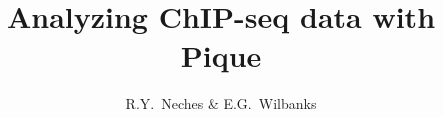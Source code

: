 \documentclass{article}
\author{R.Y.~Neches \& E.G.~Wilbanks}
\title{Analyzing ChIP-seq data with Pique}
\begin{document}
\maketitle

\newcommand{\imsize}{0.45\columnwidth}
\newcommand{\threeup}{0.26\columnwidth}
\newcommand{\cotwo}{$\text{CO}_{2}$}
\newcommand{\htwo}{$\text{H}_2$}
\newcommand{\otwo}{$\text{O}_2$}
\newcommand{\water}{$\text{H}_2\text{O}$}
\newcommand{\htwos}{$\text{H}_2\text{S}$}

%
%
%
\end{document}
